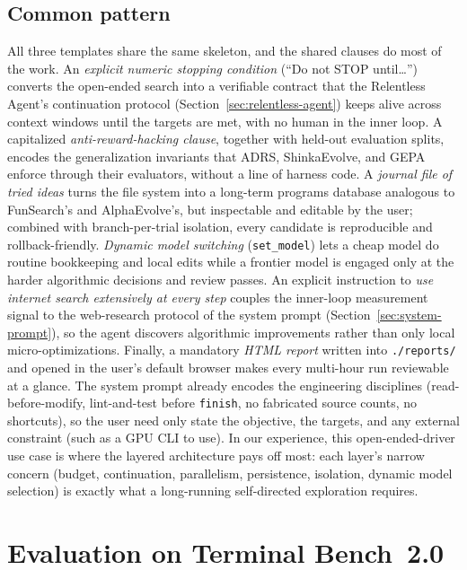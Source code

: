 \documentclass{article}
\begin{document}
\subsection*{Common pattern}

All three templates share the same skeleton, and the shared clauses do most of the work.  An \emph{explicit numeric stopping condition} (``Do not STOP until\ldots'') converts the open-ended search into a verifiable contract that the Relentless Agent's continuation protocol (Section~\ref{sec:relentless-agent}) keeps alive across context windows until the targets are met, with no human in the inner loop.  A capitalized \emph{anti-reward-hacking clause}, together with held-out evaluation splits, encodes the generalization invariants that ADRS, ShinkaEvolve, and GEPA enforce through their evaluators, without a line of harness code.  A \emph{journal file of tried ideas} turns the file system into a long-term programs database analogous to FunSearch's and AlphaEvolve's, but inspectable and editable by the user; combined with branch-per-trial isolation, every candidate is reproducible and rollback-friendly.  \emph{Dynamic model switching} (\texttt{set\_model}) lets a cheap model do routine bookkeeping and local edits while a frontier model is engaged only at the harder algorithmic decisions and review passes.  An explicit instruction to \emph{use internet search extensively at every step} couples the inner-loop measurement signal to the web-research protocol of the system prompt (Section~\ref{sec:system-prompt}), so the agent discovers algorithmic improvements rather than only local micro-optimizations.  Finally, a mandatory \emph{HTML report} written into \texttt{./reports/} and opened in the user's default browser makes every multi-hour run reviewable at a glance.  The system prompt already encodes the engineering disciplines (read-before-modify, lint-and-test before \texttt{finish}, no fabricated source counts, no shortcuts), so the user need only state the objective, the targets, and any external constraint (such as a GPU CLI to use).  In our experience, this open-ended-driver use case is where the layered architecture pays off most: each layer's narrow concern (budget, continuation, parallelism, persistence, isolation, dynamic model selection) is exactly what a long-running self-directed exploration requires.

\section{Evaluation on Terminal Bench~2.0}
\label{sec:evaluation}
\end{document}
